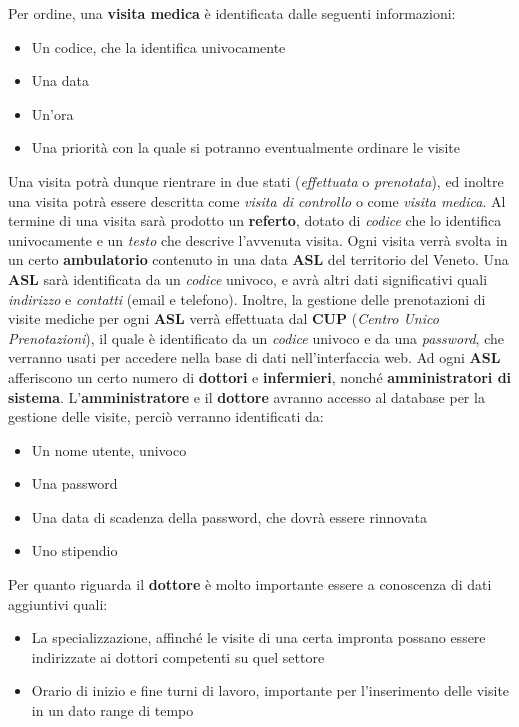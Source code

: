 \documentclass{report}
\begin{document}
 Per ordine, una \textbf{visita medica} è identificata dalle seguenti informazioni:
\begin{itemize}
\item Un codice, che la identifica univocamente
\item Una data
\item Un'ora
\item Una priorità con la quale si potranno eventualmente ordinare le visite
\end{itemize}
Una visita potrà dunque rientrare in due stati (\textit{effettuata} o \textit{prenotata}), ed inoltre una visita potrà essere descritta come \textit{visita di controllo} o come \textit{visita medica}. Al termine di una visita sarà prodotto un \textbf{referto}, dotato di \textit{codice} che lo identifica univocamente e un \textit{testo} che descrive l'avvenuta visita. Ogni visita verrà svolta in un certo \textbf{ambulatorio} contenuto in una data \textbf{ASL} del territorio del Veneto. Una \textbf{ASL} sarà identificata da un \textit{codice} univoco, e avrà altri dati significativi quali \textit{indirizzo} e \textit{contatti} (email e telefono). Inoltre, la gestione delle prenotazioni di visite mediche per ogni \textbf{ASL} verrà effettuata dal \textbf{CUP} (\textit{Centro Unico Prenotazioni}), il quale è identificato da un \textit{codice} univoco e da una \textit{password}, che verranno usati per accedere nella base di dati nell'interfaccia web. Ad ogni \textbf{ASL} afferiscono un certo numero di \textbf{dottori} e \textbf{infermieri}, nonché \textbf{amministratori di sistema}. L'\textbf{amministratore} e il \textbf{dottore} avranno accesso al database per la gestione delle visite, perciò verranno identificati da:
\begin{itemize}
\item Un nome utente, univoco
\item Una password
\item Una data di scadenza della password, che dovrà essere rinnovata 
\item Uno stipendio
\end{itemize}
Per quanto riguarda il \textbf{dottore} è molto importante essere a conoscenza di dati aggiuntivi quali:
\begin{itemize}
\item La specializzazione, affinché le visite di una certa impronta possano essere indirizzate ai dottori competenti su quel settore
\item Orario di inizio e fine turni di lavoro, importante per l'inserimento delle visite in un dato range di tempo
\end{itemize}
\end{document}
